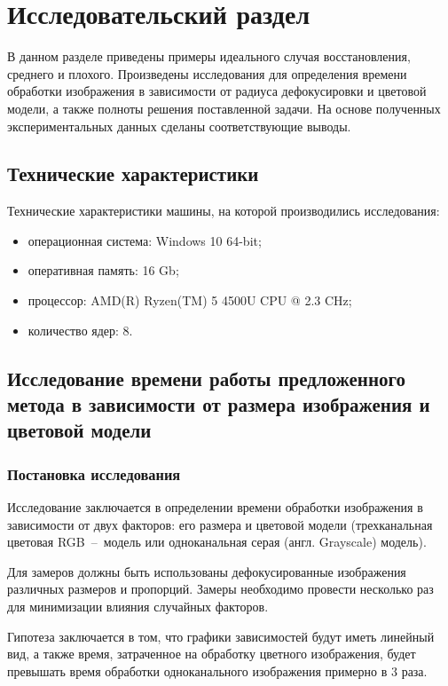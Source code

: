 \chapter{Исследовательский раздел}

В данном разделе приведены примеры идеального случая восстановления, среднего и плохого. Произведены исследования для определения времени обработки изображения в зависимости от радиуса дефокусировки и цветовой модели, а также полноты решения поставленной задачи. На основе полученных экспериментальных данных сделаны соответствующие выводы.

\section{Технические характеристики}

Технические характеристики машины, на которой производились исследования:

\begin{itemize}
	\item операционная система: Windows 10 64-bit;
	\item оперативная память: 16 Gb;
	\item процессор: AMD(R) Ryzen(TM) 5 4500U CPU @ 2.3 CHz;
	\item количество ядер: 8.
\end{itemize}

\section{Исследование времени работы предложенного метода в зависимости от размера изображения и цветовой модели}

\subsection*{Постановка исследования}

Исследование заключается в определении времени обработки изображения в зависимости от двух факторов: его размера и цветовой модели (трехканальная цветовая RGB~--~модель или одноканальная серая (англ. Grayscale) модель). 

Для замеров должны быть использованы дефокусированные изображения различных размеров и пропорций. Замеры необходимо провести несколько раз для минимизации влияния случайных факторов.

Гипотеза заключается в том, что графики зависимостей будут иметь линейный вид, а также время, затраченное на обработку цветного изображения, будет превышать время обработки одноканального изображения примерно в 3 раза.

